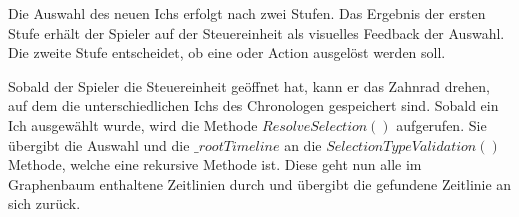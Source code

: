

Die Auswahl des neuen Ichs erfolgt nach zwei Stufen. Das Ergebnis der ersten Stufe erhält der Spieler auf der Steuereinheit als visuelles Feedback der Auswahl. Die zweite Stufe entscheidet, ob eine  oder  Action ausgelöst werden soll.

Sobald der Spieler die Steuereinheit geöffnet hat, kann er das Zahnrad drehen, auf dem die unterschiedlichen Ichs des Chronologen gespeichert sind. Sobald ein Ich ausgewählt wurde, wird die  Methode $ResolveSelection()$ aufgerufen. Sie übergibt die Auswahl und die $\_rootTimeline$ an die $SelectionTypeValidation()$ Methode, welche eine rekursive Methode ist. Diese geht nun alle im Graphenbaum enthaltene Zeitlinien durch und übergibt die gefundene Zeitlinie an sich zurück. 

